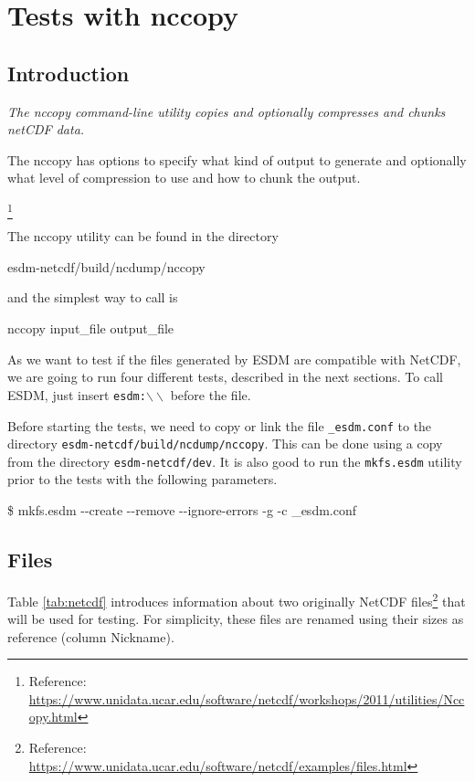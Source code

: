 \chapter{Tests with nccopy}
\label{ch:nccopy}

\section{Introduction}

{\itshape
The nccopy command-line utility copies and optionally compresses and chunks netCDF data.

The nccopy has options to specify what kind of output to generate and optionally what level of compression to use and how to chunk the output.
}\footnote{Reference: \url{https://www.unidata.ucar.edu/software/netcdf/workshops/2011/utilities/Nccopy.html}}

The nccopy utility can be found in the directory

\begin{framed}
esdm-netcdf/build/ncdump/nccopy
\end{framed}

and the simplest way to call is

\begin{framed}
nccopy input\_file output\_file
\end{framed}

As we want to test if the files generated by ESDM are compatible with NetCDF, we are going to run four different tests, described in the next sections.
To call ESDM, just insert \texttt{esdm:$\backslash\backslash$} before the file.

Before starting the tests, we need to copy or link the file \texttt{\_esdm.conf} to the directory \texttt{esdm-netcdf/build/ncdump/nccopy}.
This can be done using a copy from the directory \texttt{esdm-netcdf/dev}.
It is also good to run the \texttt{mkfs.esdm} utility prior to the tests with the following parameters.

\begin{framed}
\$ mkfs.esdm {-}{-}create {-}{-}remove {-}{-}ignore-errors -g -c \_esdm.conf
\end{framed}

\section{Files}

Table \ref{tab:netcdf} introduces information about two originally NetCDF files\footnote{Reference: \url{https://www.unidata.ucar.edu/software/netcdf/examples/files.html}} that will be used for testing.
For simplicity, these files are renamed using their sizes as reference (column Nickname).


